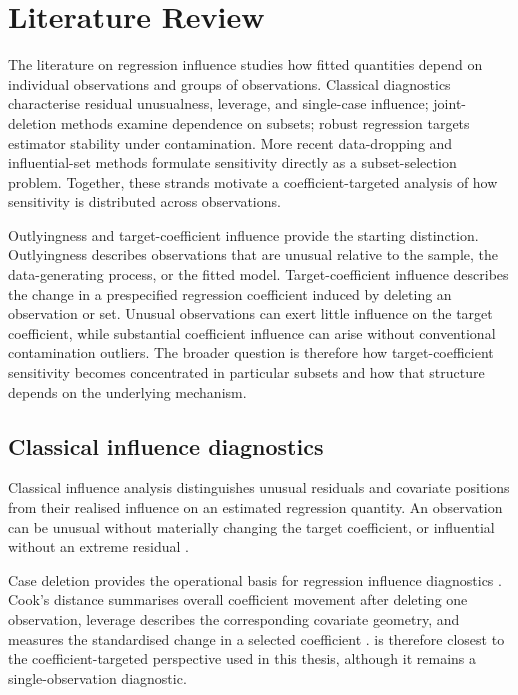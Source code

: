 \documentclass[../main.tex]{subfiles}
\begin{document}
\section{Literature Review}

The literature on regression influence studies how fitted quantities depend on individual observations and groups of observations. Classical diagnostics characterise residual unusualness, leverage, and single-case influence; joint-deletion methods examine dependence on subsets; robust regression targets estimator stability under contamination. More recent data-dropping and influential-set methods formulate sensitivity directly as a subset-selection problem. Together, these strands motivate a coefficient-targeted analysis of how sensitivity is distributed across observations.

Outlyingness and target-coefficient influence provide the starting distinction. Outlyingness describes observations that are unusual relative to the sample, the data-generating process, or the fitted model. Target-coefficient influence describes the change in a prespecified regression coefficient induced by deleting an observation or set. Unusual observations can exert little influence on the target coefficient, while substantial coefficient influence can arise without conventional contamination outliers. The broader question is therefore how target-coefficient sensitivity becomes concentrated in particular subsets and how that structure depends on the underlying mechanism.

\subsection{Classical influence diagnostics}
\label{subsec:classical_influence_diagnostics}

Classical influence analysis distinguishes unusual residuals and covariate positions from their realised influence on an estimated regression quantity. An observation can be unusual without materially changing the target coefficient, or influential without an extreme residual \parencite{hampel1974influence,chatterjee1986influential}.

Case deletion provides the operational basis for regression influence diagnostics \parencite{cook2000detection}. Cook's distance summarises overall coefficient movement after deleting one observation, leverage describes the corresponding covariate geometry, and \dfbetas{} measures the standardised change in a selected coefficient \parencite{hoaglin1978hat,chatterjee1986influential}. \dfbetas{} is therefore closest to the coefficient-targeted perspective used in this thesis, although it remains a single-observation diagnostic.
\end{document}
